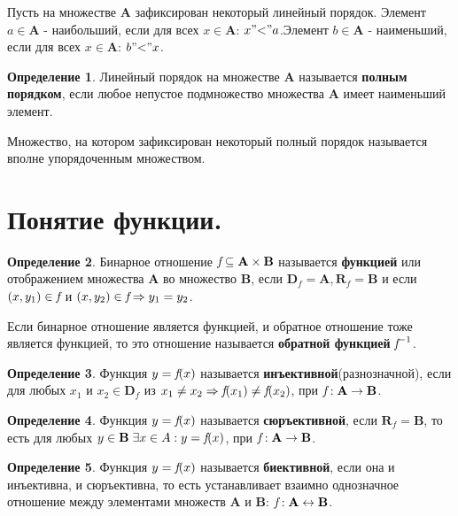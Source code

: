 \documentclass[12pt, a4paper, oneside]{article}
\theoremstyle{plain} %
\theoremstyle{definition}
\newtheorem*{definition}{Определение}  %
\newcommand{\indef}[1]{\textbf{ \color{dark_red} #1}}
\begin{document}
Пусть на множестве \textbf{A} зафиксирован некоторый линейный порядок. Элемент $a \in \textbf{A}$ - наибольший, если для всех $x \in \textbf{A}$: $x "\textrm{<}" a$.Элемент $b \in \textbf{A}$ - наименьший, если для всех $x \in \textbf{A}$: $b "\textrm{<}" x$.

\begin{definition}
Линейный порядок на множестве \textbf{A} называется \indef{полным порядком}, если любое непустое подмножество множества \textbf{A} имеет наименьший элемент.
\end{definition}

Множество, на котором зафиксирован некоторый полный порядок называется вполне упорядоченным множеством.

\section{Понятие функции.}

\begin{definition}
Бинарное отношение $\emph{f} \subseteq \textbf{A} \times \textbf{B}$ называется \indef{функцией} или отображением множества \textbf{A} во множество \textbf{B}, если $\textbf{D}_f = \textbf{A}, \textbf{R}_f = \textbf{B}$ и если $(x,y_1) \in \emph{f}$ и $(x,y_2) \in \emph{f} \Rightarrow y_1 = y_2$.
\end{definition}

Если бинарное отношение является функцией, и обратное отношение тоже является функцией, то это отношение называется \indef{обратной функцией} $\emph{f}^{-1}$.

\begin{definition}
Функция $y = \emph{f}(x)$ называется \indef{инъективной}(разнозначной), если для любых $x_1$ и $x_2 \in \textbf{D}_f$ из $x_1 \neq x_2 \Rightarrow \emph{f}(x_1) \neq \emph{f}(x_2)$, при $\emph{f}: \textbf{A} \rightarrow \textbf{B}$. 
\end{definition}

\begin{definition}
Функция $y = \emph{f}(x)$ называется \indef{сюръективной}, если $\textbf{R}_f = \textbf{B}$, то есть для любых $y \in \textbf{B} \hspace{1mm}\exists x \in A: y = \emph{f}(x)$, при $\emph{f}: \textbf{A} \rightarrow \textbf{B}$.
\end{definition}

\begin{definition}
Функция $y = \emph{f}(x)$ называется \indef{биективной}, если она и инъективна, и сюръективна, то есть устанавливает взаимно однозначное отношение между элементами множеств \textbf{A} и \textbf{B}: $\emph{f}: \textbf{A} \leftrightarrow \textbf{B}$. 
\end{definition}
\end{document}
